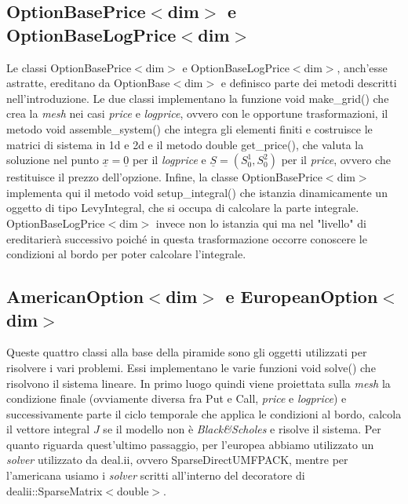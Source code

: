 \documentclass[a4paper,10pt]{report}
\theoremstyle{plain}
\theoremstyle{definition}
\theoremstyle{remark}
\begin{document}
\subsection{\textsf{OptionBasePrice$<$dim$>$} e \textsf{OptionBaseLogPrice$<$dim$>$}}
Le classi \textsf{OptionBasePrice$<$dim$>$} e \textsf{OptionBaseLogPrice$<$dim$>$}, anch'esse astratte, ereditano da \textsf{OptionBase$<$dim$>$} e definisco parte dei metodi descritti nell'introduzione. Le due classi implementano la funzione \textsf{void make\_grid()} che crea la \emph{mesh} nei casi \emph{price} e \emph{logprice}, ovvero con le opportune trasformazioni, il metodo \textsf{void assemble\_system()} che integra gli elementi finiti e costruisce le matrici di sistema in 1d e 2d e il metodo \textsf{double get\_price()}, che valuta la soluzione nel punto $\underline{x}=\underline{0}$ per il \emph{logprice} e $\underline{S}=(S_0^1, S_0^2)$ per il \emph{price}, ovvero che restituisce il prezzo dell'opzione. Infine, la classe \textsf{OptionBasePrice$<$dim$>$} implementa qui il metodo \textsf{void setup\_integral()} che istanzia dinamicamente un oggetto di tipo \textsf{LevyIntegral}, che si occupa di calcolare la parte integrale. \textsf{OptionBaseLogPrice$<$dim$>$} invece non lo istanzia qui ma nel "livello" di ereditarier\`a successivo poich\'e in questa trasformazione occorre conoscere le condizioni al bordo per poter calcolare l'integrale.
\subsection{\textsf{AmericanOption$<$dim$>$} e \textsf{EuropeanOption$<$dim$>$}}
Queste quattro classi alla base della piramide sono gli oggetti utilizzati per risolvere i vari problemi. Essi implementano le varie funzioni \textsf{void solve()} che risolvono il sistema lineare. In primo luogo quindi viene proiettata sulla \emph{mesh} la condizione finale (ovviamente diversa fra Put e Call, \emph{price} e \emph{logprice}) e successivamente parte il ciclo temporale che applica le condizioni al bordo, calcola il vettore integral $J$ se il modello non \`e \emph{Black\&Scholes} e risolve il sistema. Per quanto riguarda quest'ultimo passaggio, per l'europea abbiamo utilizzato un \emph{solver} utilizzato da \textsf{deal.ii}, ovvero \textsf{SparseDirectUMFPACK}, mentre per l'americana usiamo i \emph{solver} scritti all'interno del decoratore di \textsf{dealii::SparseMatrix$<$double$>$}.

\end{document}
